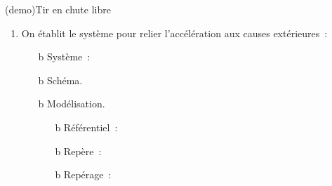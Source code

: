\documentclass[../../main/main.tex]{subfiles}
\begin{document}
\begin{tcb*}[breakable](demo){Tir en chute libre}
	\begin{enumerate}
		\item On établit le système pour relier l'accélération aux causes
		      extérieures~:
		      \smallbreak
		      \begin{minipage}[t]{0.50\linewidth}
			      \begin{enumerate}[label=\sqenumi]
				      \item[b]{Système}~: %
				      \item[b]{Schéma}.
				      \item[b]{Modélisation}.
				            \begin{itemize}
					            \item[b]{Référentiel}~: 
					            \item[b]{Repère}~: 
					            \item[b]{Repérage}~:
				            \end{itemize}
			      \end{enumerate}
		      \end{minipage}
		      \hfill
		      \begin{minipage}[t]{0.45\linewidth}
			      \begin{center}
				      \vspace{-12pt}
\end{center}
\end{minipage}
\end{enumerate}
\end{tcb*}
\end{document}
